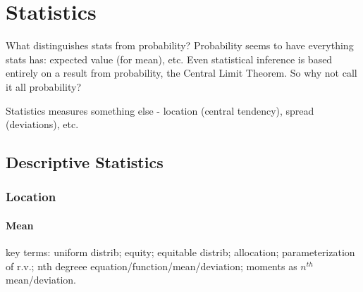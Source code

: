 \part{Statistics}

\begin{remark}
  What distinguishes stats from probability?  Probability seems to
  have everything stats has: expected value (for mean), etc.  Even
  statistical inference is based entirely on a result from
  probability, the Central Limit Theorem.  So why not call it all
  probability?

Statistics measures something else
  - location (central tendency), spread (deviations), etc.
\end{remark}

\chapter{Descriptive Statistics}

\section{Location}

\subsection{Mean}
\label{subs:mean}

\begin{ednote}
  key terms: uniform distrib; equity; equitable distrib; allocation;
  parameterization of r.v.; nth degreee
  equation/function/mean/deviation; moments as \(n^{th}\)
  mean/deviation.
\end{ednote}


